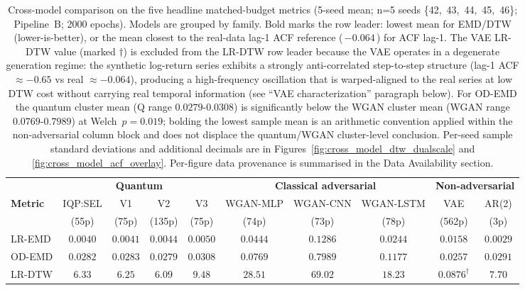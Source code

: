 \documentclass[12pt,twocolumn]{article}
\begin{document}
\begin{table}[!htbp]
\centering
\caption{Cross-model comparison on the five headline matched-budget metrics
(5-seed mean; n=5 seeds \{42,~43,~44,~45,~46\}; Pipeline~B; 2000 epochs).
Models are grouped by family. Bold marks the row leader: lowest mean for
EMD/DTW (lower-is-better), or the mean closest to the real-data lag-1 ACF
reference (\,$-0.064$\,) for ACF lag-1. The VAE LR-DTW value (marked
$\dagger$) is excluded from the LR-DTW row leader because the VAE operates
in a degenerate generation regime: the synthetic log-return series
exhibits a strongly anti-correlated step-to-step structure (lag-1 ACF
$\approx -0.65$ vs real $\approx -0.064$), producing a high-frequency
oscillation that is warped-aligned to the real series at low DTW cost
without carrying real temporal information (see ``VAE characterization''
paragraph below). For OD-EMD the quantum cluster mean (Q range
$0.0279$-$0.0308$) is significantly below the WGAN cluster mean (WGAN
range $0.0769$-$0.7989$) at Welch~$p = 0.019$; bolding the lowest
sample mean is an arithmetic convention applied within the
non-adversarial column block and does not displace the quantum/WGAN
cluster-level conclusion.
Per-seed sample standard deviations and additional decimals are in
Figures~\ref{fig:cross_model_dtw_dualscale} and
\ref{fig:cross_model_acf_overlay}. Per-figure data provenance is summarised
in the Data Availability section.}
\label{tbl:cross_model_comparison}
\scriptsize
\setlength{\tabcolsep}{3pt}
\renewcommand{\arraystretch}{1.15}
\begin{tabular}{@{}lccccccccc@{}}
\toprule
 & \multicolumn{4}{c}{\textbf{Quantum}} & \multicolumn{3}{c}{\textbf{Classical adversarial}} & \multicolumn{2}{c}{\textbf{Non-adversarial}} \\
\cmidrule(lr){2-5} \cmidrule(lr){6-8} \cmidrule(lr){9-10}
\textbf{Metric} & IQP:SEL & V1 & V2 & V3 & WGAN-MLP & WGAN-CNN & WGAN-LSTM & VAE & AR(2) \\
 & (55p) & (75p) & (135p) & (75p) & (74p) & (73p) & (78p) & (562p) & (3p) \\
\midrule
LR-EMD     & $0.0040$ & $0.0041$ & $0.0044$ & $0.0050$ & $0.0444$ & $0.1286$ & $0.0244$ & $0.0158$ & $\mathbf{0.0029}$ \\
OD-EMD     & $0.0282$ & $0.0283$ & $0.0279$ & $0.0308$ & $0.0769$ & $0.7989$ & $0.1177$ & $\mathbf{0.0257}$ & $0.0291$ \\
LR-DTW     & $6.33$   & $6.25$ & $\mathbf{6.09}$ & $9.48$ & $28.51$ & $69.02$ & $18.23$ & $0.0876^{\dagger}$ & $7.70$ \\

\end{tabular}
\end{table}
\end{document}
